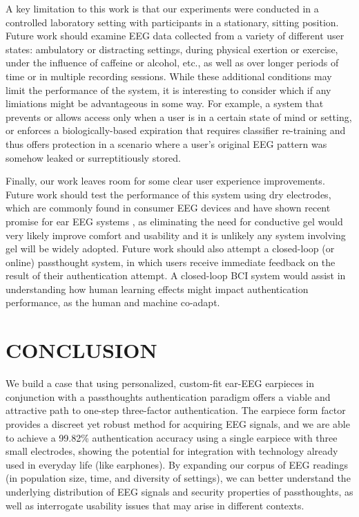 \documentclass[a4paper,twoside]{article}
\begin{document}
A key limitation to this work is that our experiments were conducted in a controlled laboratory setting with participants in a stationary, sitting position. Future work should examine EEG data collected from a variety of different user states: ambulatory or distracting settings, during physical exertion or exercise, under the influence of caffeine or alcohol, etc., as well as over longer periods of time or in multiple recording sessions. While these additional conditions may limit the performance of the system, it is interesting to consider which if any limiations might be advantageous in some way. For example, a system that prevents or allows access only when a user is in a certain state of mind or setting, or enforces a biologically-based expiration that requires classifier re-training and thus offers protection in a scenario where a user's original EEG pattern was somehow leaked or surreptitiously stored.

Finally, our work leaves room for some clear user experience improvements. Future work should test the performance of this system using dry electrodes, which are commonly found in consumer EEG devices and have shown recent promise for ear EEG systems \cite{kappel2018dry}, as eliminating the need for conductive gel would very likely improve comfort and usability and it is unlikely any  system involving gel will be widely adopted. Future work should also attempt a closed-loop (or online) passthought system, in which users receive immediate feedback on the result of their authentication attempt. A closed-loop BCI system would assist in understanding how human learning effects might impact authentication performance, as the human and machine co-adapt.

\section{\uppercase{Conclusion}}
\label{sec:conclusion}

\noindent We build a case that using personalized, custom-fit ear-EEG earpieces in conjunction with a passthoughts authentication paradigm offers a viable and attractive path to one-step three-factor authentication. The earpiece form factor provides a discreet yet robust method for acquiring EEG signals, and we are able to achieve a 99.82\% authentication accuracy using a single earpiece with three small electrodes, showing the potential for integration with technology already used in everyday life (like earphones). By expanding our corpus of EEG readings (in population size, time, and diversity of settings), we can better understand the underlying distribution of EEG signals and security properties of passthoughts, as well as interrogate usability issues that may arise in different contexts.


{\small
}

\vfill
\end{document}
